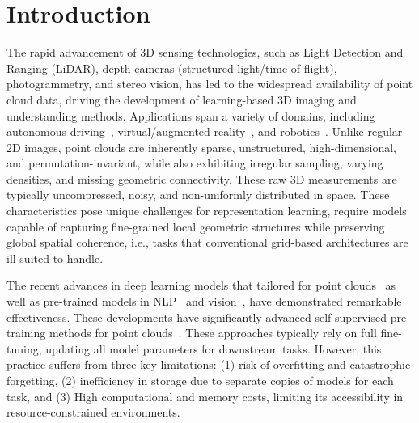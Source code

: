 \section{Introduction}
\label{sec:intro}


The rapid advancement of 3D sensing technologies, such as Light Detection and Ranging (LiDAR), depth cameras (structured light/time-of-flight), photogrammetry, and stereo vision, has led to the widespread availability of point cloud data, driving the development of learning-based 3D imaging and understanding methods. Applications span a variety of domains, including autonomous driving~\cite{yang2024visual,song2024graphbev,chen20203d}, virtual/augmented reality~\cite{casado2023rendering,garrido2021point}, and robotics~\cite{wang2021trajectory,chen2022direct,christen2023learning}. 
Unlike regular 2D images, point clouds are inherently sparse, unstructured, high-dimensional, and permutation-invariant, while also exhibiting irregular sampling, varying densities, and missing geometric connectivity. These raw 3D measurements are typically uncompressed, noisy, and non-uniformly distributed in space. These characteristics pose unique challenges for representation learning, require models capable of capturing fine-grained local geometric structures while preserving global spatial coherence, i.e., tasks that conventional grid-based architectures are ill-suited to handle.

The recent advances in deep learning models that tailored for point clouds~\cite{qi2017pointnet, qi2017pointnet++, li2018pointcnn, qian2022pointnext, wang2019dynamic, wu2024point} as well as pre-trained models in NLP~\cite{devlin2018bert, brown2020language} and vision~\cite{he2020momentum, chen2020improved}, have demonstrated remarkable effectiveness. These developments have significantly advanced self-supervised pre-training methods for point clouds~\cite{pang2022masked, yu2022point, zhang2022point, afham2022crosspoint}.
These approaches typically rely on full fine-tuning, updating all model parameters for downstream tasks. However, this practice suffers from three key limitations: (1) risk of overfitting and catastrophic forgetting, (2) inefficiency in storage due to separate copies of models for each task, and (3) High computational and memory costs, limiting its accessibility in resource-constrained environments.

